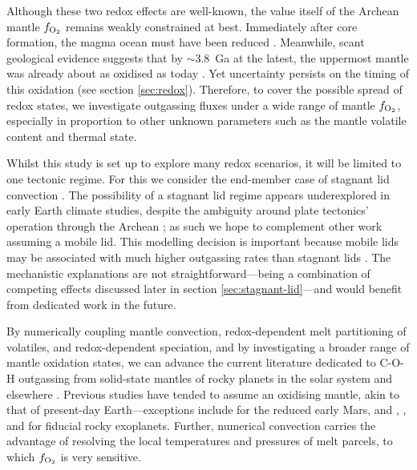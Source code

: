 Although these two redox effects are well-known, the value itself of the Archean mantle $f_{\rm O_2}$ remains weakly constrained at best. Immediately after core formation, the magma ocean must have been reduced \citep{Wood2006}. Meanwhile, scant geological evidence suggests that by $\sim$3.8~Ga at the latest, the uppermost mantle was already about as oxidised as today \citep{Canil1997, Delano2001, Trail2011, NICKLAS2019, Armstrong2019}. Yet uncertainty persists on the timing of this oxidation (see section \ref{sec:redox}). Therefore, to cover the possible spread of redox states, we investigate outgassing fluxes under a wide range of mantle $f_{\rm O_2}$, especially in proportion to other unknown parameters such as the mantle volatile content and thermal state.

Whilst this study is set up to explore many redox scenarios, it will be limited to one tectonic regime. For this we consider the end-member case of stagnant lid convection \citep{Debaille2013}. The possibility of a stagnant lid regime appears underexplored in early Earth climate studies, despite the ambiguity around plate tectonics' operation through the Archean \citep[e.g.,][]{Brown2020}; as such we hope to complement other work assuming a mobile lid. This modelling decision is important because mobile lids may be associated with much higher outgassing rates than stagnant lids \citep{noack2014can, noack_volcanism_2017}. The mechanistic explanations are not straightforward---being a combination of competing effects discussed later in section \ref{sec:stagnant-lid}---and would benefit from dedicated work in the future.

By numerically coupling mantle convection, redox-dependent melt partitioning of volatiles, and redox-dependent speciation, and by investigating a broader range of mantle oxidation states, we can advance the current literature dedicated to C-O-H outgassing from solid-state mantles of rocky planets in the solar system and elsewhere \citep{ONeill2007,Grott2011,noack2014can,noack_volcanism_2017,tosi_habitability_2017,dorn_outgassing_2018, ortenzi_mantle_2020}. Previous studies have tended to assume an oxidising mantle, akin to that of present-day Earth---exceptions include \citet{Grott2011} for the reduced early Mars, and \citet{tosi_habitability_2017}, \citet{ortenzi_mantle_2020}, and \citet{Liggins2020} for fiducial rocky exoplanets. %
Further, numerical convection carries the advantage of resolving the local temperatures and pressures of melt parcels, to which $f_{\rm O_2}$ is very sensitive. 

